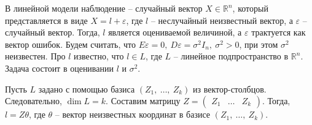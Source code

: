 В линейной модели наблюдение -- случайный вектор $\displaystyle X\in \mathbb{R}^{n}$, который представляется в виде $\displaystyle X=l+\varepsilon $, где $\displaystyle l$ -- неслучайный неизвестный вектор, а $\displaystyle \varepsilon $ -- случайный вектор. Тогда, $\displaystyle l$ является оцениваемой величиной, а $\displaystyle \varepsilon $ трактуется как вектор ошибок. Будем считать, что $\displaystyle E\varepsilon =0,\ D\varepsilon =\sigma ^{2} I_{n},\ \sigma^2 > 0$, при этом $\displaystyle \sigma ^{2}$ неизвестен. Про $\displaystyle l$ известно, что $\displaystyle l\in L$, где $\displaystyle L$ -- линейное подпространство в $\displaystyle \mathbb{R}^{n}$. Задача состоит в оценивании $\displaystyle l$ и $\displaystyle \sigma ^{2}$.

Пусть $\displaystyle L$ задано с помощью базиса $\displaystyle ( Z_{1} ,\ \dotsc ,\ Z_{k})$ из вектор-столбцов. Следовательно, $\displaystyle \dim L=k$. Составим матрицу $\displaystyle Z=\begin{pmatrix}
Z_{1} & \dotsc  & Z_{k}
\end{pmatrix}$. Тогда, $\displaystyle l=Z\theta $, где $\displaystyle \theta $ -- вектор неизвестных координат в базисе $\displaystyle ( Z_{1} ,\ \dotsc ,\ Z_{k})$.

